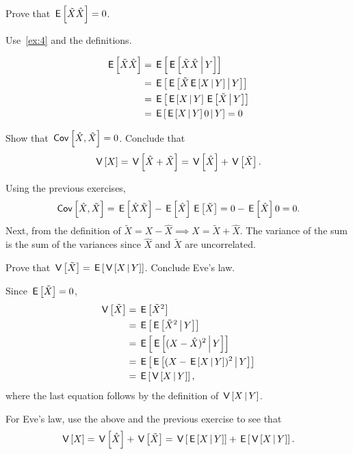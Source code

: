 \documentclass[assignments]{subfiles}
\begin{document}
\begin{exercise}
Prove that $\,\mathsf{E}\left[\tilde X\hat X\right] = 0$.
\begin{hint}
  Use~\cref{ex:4} and the definitions.
\end{hint}
\begin{solution}
\begin{align}
\label{eq:6}
\E{\tilde X\hat X} &= \E{\E{\tilde X \hat X \given Y}}  \\
&= \E{\E{\tilde X \E{X\given Y} \given Y}}  \\
&= \E{\E{X\given Y}\E{\tilde X \given Y}}  \\
&= \E{\E{X\given Y} 0  \given Y}  = 0
\end{align}
\end{solution}
\end{exercise}

\begin{exercise}
Show that $\,\mathsf{Cov}\left[\hat X, \tilde X\right] = 0$. Conclude that
\begin{equation}
\label{eq:8}
\V{X} = \V{\hat X + \tilde X} = \V{\hat X} + \V{\tilde X}.
\end{equation}
\begin{solution}
Using the previous exercises,
\begin{equation}
\label{eq:7}
\cov{\hat X, \tilde X} = \E{\hat X \tilde X} - \E{\hat X} \E{\tilde X} = 0 - \E{\hat X} 0 = 0.
\end{equation}
Next, from the definition of $\tilde X = X - \hat X \implies X = \tilde X + \hat X$.
The variance of the sum is the sum of the variances since $\hat X$ and $\tilde X$ are uncorrelated.
\end{solution}
\end{exercise}

\begin{exercise}
Prove that $\,\mathsf{V}\left[\tilde X\right] = \,\mathsf{E}\left[\,\mathsf{V}\left[X\,\middle|\, Y\right]\right]$. Conclude Eve's law.
\begin{solution}
Since $\,\mathsf{E}\left[\tilde X\right] = 0$,
\begin{align}
\label{eq:9}
\V{\tilde X} &= \E{\tilde X^{2}}  \\
&= \E{\E{\tilde X^{2}\given Y}} \\
&= \E{\E{(X - \hat X)^{2}\given Y}} \\
&= \E{\E{(X - \E{X\given Y})^{2}\given Y}} \\
&= \E{\V{X\given Y}},
\end{align}
where the last equation follows by the definition of $\,\mathsf{V}\left[X\,\middle|\, Y\right]$.

For Eve's law, use the above and the previous exercise to see that
\begin{equation}
\label{eq:10}
\V{X} = \V{\hat X} + \V{\tilde X} = \V{\E{X\given Y}} + \E{\V{X\given Y}}.
\end{equation}
\end{solution}
\end{exercise}
\end{document}
